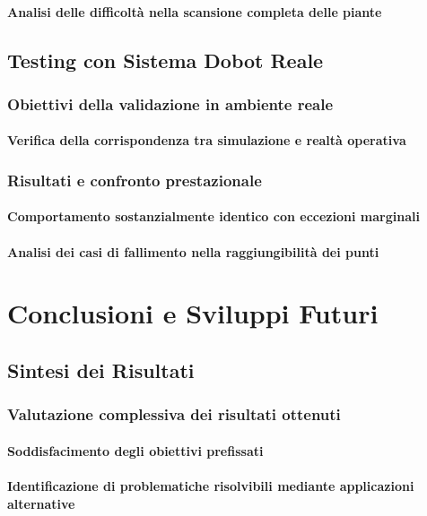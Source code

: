 \documentclass[12pt,a4paper,twoside,openright]{book}
\begin{document}
	\subsubsection{Analisi delle difficoltà nella scansione completa delle piante}
	
	\section{Testing con Sistema Dobot Reale}
	\subsection{Obiettivi della validazione in ambiente reale}
	\subsubsection{Verifica della corrispondenza tra simulazione e realtà operativa}
	\subsection{Risultati e confronto prestazionale}
	\subsubsection{Comportamento sostanzialmente identico con eccezioni marginali}
	\subsubsection{Analisi dei casi di fallimento nella raggiungibilità dei punti}
	
	
	\chapter{Conclusioni e Sviluppi Futuri}
	\section{Sintesi dei Risultati}
	\subsection{Valutazione complessiva dei risultati ottenuti}
	\subsubsection{Soddisfacimento degli obiettivi prefissati}
	\subsubsection{Identificazione di problematiche risolvibili mediante applicazioni alternative}
	
\end{document}
